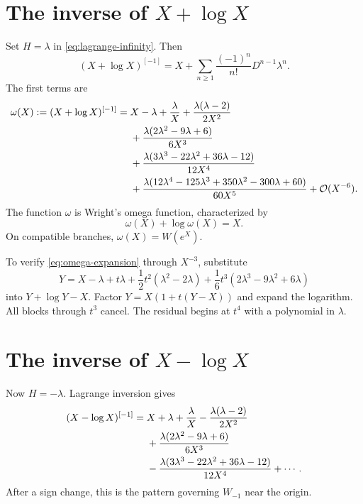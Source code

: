 \documentclass[11pt,openany]{book}
\theoremstyle{definition}
\theoremstyle{plain}
\theoremstyle{remark}
\newcommand{\bigO}{\mathcal{O}}
\newcommand{\invcomp}{^{[-1]}}
\begin{document}
\section{The inverse of \texorpdfstring{\(X+\log X\)}{X+log X}}
Set \(H=\lambda\) in \cref{eq:lagrange-infinity}. Then
\begin{equation}\label{eq:omega-lagrange}
 (X+\log X)\invcomp
 =X+\sum_{n\ge1}\frac{(-1)^n}{n!}D^{n-1}\lambda^n.
\end{equation}
The first terms are
\begin{align}
 \omega(X):=(X+\log X)\invcomp
 ={}&X-\lambda+\frac{\lambda}{X}
 +\frac{\lambda(\lambda-2)}{2X^2}\notag\\
 &+\frac{\lambda(2\lambda^2-9\lambda+6)}{6X^3}\notag\\
 &+\frac{\lambda(3\lambda^3-22\lambda^2+36\lambda-12)}{12X^4}\notag\\
 &+\frac{\lambda(12\lambda^4-125\lambda^3+350\lambda^2-300\lambda+60)}{60X^5}
 +\bigO(X^{-6}).
\label{eq:omega-expansion}
\end{align}
The function \(\omega\) is Wright's omega function, characterized by
\begin{equation}\label{eq:omega-equation}
 \omega(X)+\log\omega(X)=X.
\end{equation}
On compatible branches, \(\omega(X)=W(e^X)\).

\begin{workedbox}
To verify \cref{eq:omega-expansion} through \(X^{-3}\), substitute
\[
 Y=X-\lambda+t\lambda
 +\frac12t^2(\lambda^2-2\lambda)
 +\frac16t^3(2\lambda^3-9\lambda^2+6\lambda)
\]
into \(Y+\log Y-X\). Factor \(Y=X(1+t(Y-X))\) and expand the logarithm. All blocks through \(t^3\) cancel. The residual begins at \(t^4\) with a polynomial in \(\lambda\).
\end{workedbox}

\section{The inverse of \texorpdfstring{\(X-\log X\)}{X-log X}}
Now \(H=-\lambda\). Lagrange inversion gives
\begin{align}
 (X-\log X)\invcomp
 ={}&X+\lambda+\frac{\lambda}{X}
 -\frac{\lambda(\lambda-2)}{2X^2}\notag\\
 &+\frac{\lambda(2\lambda^2-9\lambda+6)}{6X^3}\notag\\
 &-\frac{\lambda(3\lambda^3-22\lambda^2+36\lambda-12)}{12X^4}
 +\cdots.
\label{eq:inverse-X-minus-log}
\end{align}
After a sign change, this is the pattern governing \(W_{-1}\) near the origin.
\end{document}
